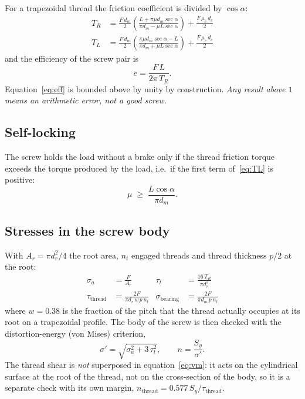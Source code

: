 \documentclass[11pt]{article}
\begin{document}
For a trapezoidal thread the friction coefficient is divided by $\cos\alpha$:
\begin{align}
T_R &= \frac{F\,d_m}{2}\left(\frac{L+\pi\mu d_m\sec\alpha}{\pi d_m-\mu L\sec\alpha}\right)
       + \frac{F\,\mu_c\,d_c}{2} \label{eq:TR}\\[4pt]
T_L &= \frac{F\,d_m}{2}\left(\frac{\pi\mu d_m\sec\alpha-L}{\pi d_m+\mu L\sec\alpha}\right)
       + \frac{F\,\mu_c\,d_c}{2} \label{eq:TL}
\end{align}
and the efficiency of the screw pair is
\begin{equation}
e=\frac{F\,L}{2\pi\,T_R}.
\label{eq:eff}
\end{equation}
Equation~\eqref{eq:eff} is bounded above by unity by construction. \emph{Any result above
$1$ means an arithmetic error, not a good screw.}

\subsection{Self-locking}

The screw holds the load without a brake only if the thread friction torque exceeds the
torque produced by the load, i.e.\ if the first term of~\eqref{eq:TL} is positive:
\begin{equation}
\mu \;\ge\; \frac{L\cos\alpha}{\pi d_m}.
\label{eq:selflock}
\end{equation}

\subsection{Stresses in the screw body}

With $A_r=\pi d_r^2/4$ the root area, $n_t$ engaged threads and thread thickness $p/2$ at
the root:
\begin{align}
\sigma_a &= \frac{F}{A_r}
&\tau_t &= \frac{16\,T_R}{\pi d_r^{3}} \\
\tau_{\text{thread}} &= \frac{2F}{\pi d_r\,w\,p\,n_t}
&\sigma_{\text{bearing}} &= \frac{2F}{\pi d_m\,p\,n_t}
\end{align}
where $w=0.38$ is the fraction of the pitch that the thread actually occupies at its root
on a trapezoidal profile. The body of the screw is then checked with the
distortion-energy (von Mises) criterion,
\begin{equation}
\sigma' = \sqrt{\sigma_a^2 + 3\,\tau_t^2} ,
\qquad n = \frac{S_y}{\sigma'} .
\label{eq:vm}
\end{equation}
The thread shear is \emph{not} superposed in equation~\eqref{eq:vm}: it acts on the
cylindrical surface at the root of the thread, not on the cross-section of the body, so it
is a separate check with its own margin,
$n_{\text{thread}} = 0.577\,S_y/\tau_{\text{thread}}$.
\end{document}
